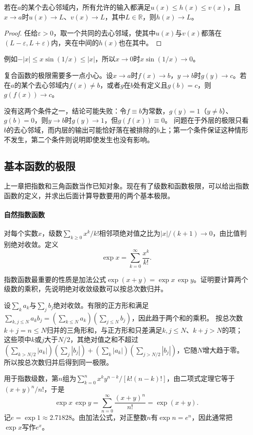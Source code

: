 \begin{theorem}[函数极限的夹逼定理]
\label{thm:ru-function-squeeze}
若在$a$的某个去心邻域内，所有允许的输入都满足$u(x)\leq h(x)\leq v(x)$，且$x\to a$时$u(x)\to L$、$v(x)\to L$，其中$L\in\mathbb R$，则$h(x)\to L$。
\end{theorem}
\begin{proof}
任给$\varepsilon>0$，取一个共同的去心邻域，使其中$u(x)$与$v(x)$都落在$(L-\varepsilon,L+\varepsilon)$内，夹在中间的$h(x)$也在其中。
\end{proof}
例如$-|x|\leq x\sin(1/x)\leq|x|$，所以$x\to0$时$x\sin(1/x)\to0$。

复合函数的极限需要多一点小心。设$x\to a$时$f(x)\to b$，$y\to b$时$g(y)\to c$。若在$a$的某个去心邻域内$f(x)\neq b$，或者$g$在$b$处有定义且$g(b)=c$，则$g(f(x))\to c$。

没有这两个条件之一，结论可能失败：令$f\equiv b$为常数，$g(y)=1$（$y\neq b$）、$g(b)=0$，则$y\to b$时$g(y)\to1$，但$g(f(x))\equiv0$。
问题在于外层的极限只看$b$的去心邻域，而内层的输出可能恰好落在被排除的$b$上；第一个条件保证这种情形不发生，第二个条件则说明即使发生也没有影响。

\subsection{基本函数的极限}
\label{sec:ru-elementary-limits}

上一章把指数和三角函数当作已知对象。现在有了级数和函数极限，可以给出指数函数的定义，并求出后面计算导数要用的两个基本极限。

\paragraph{自然指数函数}
对每个实数$x$，级数$\sum_{k\geq0}x^k/k!$相邻项绝对值之比为$|x|/(k+1)\to0$，由比值判别绝对收敛。定义
\[
 \exp x=\sum_{k=0}^\infty\frac{x^k}{k!}.
\]

指数函数最重要的性质是加法公式$\exp(x+y)=\exp x\,\exp y$。证明要计算两个级数的乘积，先说明绝对收敛级数可以按总次数归并。

设$\sum_ka_k$与$\sum_jb_j$绝对收敛。有限的正方形和满足$\sum_{k,j\leq N}a_kb_j=(\sum_{k\leq N}a_k)(\sum_{j\leq N}b_j)$，因此趋于两个和的乘积。
按总次数$k+j=n\leq N$归并的三角形和，与正方形和只差满足$k,j\leq N$、$k+j>N$的项；这些项中$k$或$j$大于$N/2$，其绝对值之和不超过
$(\sum_{k>N/2}|a_k|)(\sum_j|b_j|)+(\sum_k|a_k|)(\sum_{j>N/2}|b_j|)$，它随$N$增大趋于零。所以按总次数归并后得到同一极限。

用于指数级数，第$n$组为$\sum_{k=0}^nx^ky^{n-k}/[k!(n-k)!]$，由二项式定理它等于$(x+y)^n/n!$，于是
\[
 \exp x\,\exp y=\sum_{n=0}^\infty\frac{(x+y)^n}{n!}=\exp(x+y).
\]
记$e=\exp1\approx2.71828$。由加法公式，对正整数$n$有$\exp n=e^n$，因此通常把$\exp x$写作$e^x$。

